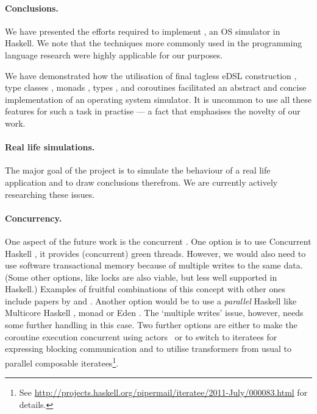 \paragraph{Conclusions.}
We have presented the efforts required to implement \soosim, an OS simulator in Haskell.
We note that the techniques more commonly used in the programming language research were highly applicable for our purposes.

We have demonstrated how the utilisation of final tagless eDSL construction \cite{final_tagless_embedding,Hofer:2008:PED:1449913.1449935}, type classes \cite{Hall:1996:TCH:227699.227700}, monads \cite{Wadler:1990:CM:91556.91592},  types \cite{Abadi:1991:DTS:103135.103138}, and coroutines \cite{coroutines,cmt} facilitated an abstract and concise implementation of an operating system simulator.
It is uncommon to use all these features for such a task in practise --- a fact that emphasises the novelty of our work.

\paragraph{Real life simulations.}
The major goal of the project is to simulate the behaviour of a real life application and to draw conclusions therefrom.
We are currently actively researching these issues.

\paragraph{Concurrency.}
One aspect of the future work is the concurrent \soosim.
One option is to use Concurrent Haskell \cite{ConcHs}, it provides (concurrent) green threads.
However, we would also need to use software transactional memory
\cite{springerlink:10.1007/s004460050028} because of multiple writes
to the same data. (Some other options, like locks are also viable, but
less well supported in Haskell.)
Examples of fruitful combinations of this concept with other ones include papers by \citeauthor{Harris:2008:CMT:1378704.1378725} \cite{Harris:2008:CMT:1378704.1378725} and \citeauthor{Bieniusa:2010:BAA:1835698.1835714} \cite{Bieniusa:2010:BAA:1835698.1835714,springerlink:10.1007/978-3-642-25959-3_2}.
Another option would be to use a \emph{parallel} Haskell like Multicore Haskell \cite{marlow:rsm},  monad \cite{par-monad} or Eden \cite{eden}.
The `multiple writes' issue, however, needs some further handling in this case.
Two further options are either to make the coroutine execution concurrent using actors~\cite{Hewitt:1973:UMA:1624775.1624804,sulzmann2008actors} or to switch to iteratees for expressing blocking communication and to utilise transformers from usual to parallel composable iteratees\footnote{See \url{http://projects.haskell.org/pipermail/iteratee/2011-July/000083.html} for details.}.

